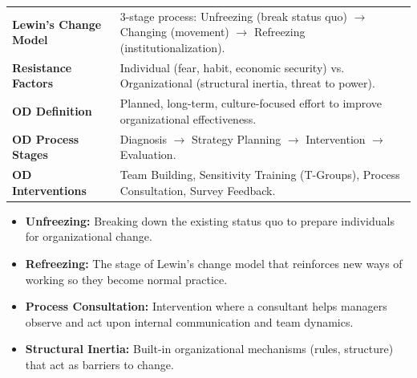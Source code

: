 \documentclass[11pt,a4paper]{article}
\begin{document}
\begin{tcolorbox}[formulabox, title={\textbf{Key Concepts and Metrics at a Glance}}]
\renewcommand{\arraystretch}{1.35}
\begin{tabularx}{\linewidth}{>{\raggedright\arraybackslash\bfseries}p{4.5cm} X}
Lewin's Change Model & 3-stage process: Unfreezing (break status quo) $\to$ Changing (movement) $\to$ Refreezing (institutionalization). \\[4pt]
Resistance Factors & Individual (fear, habit, economic security) vs. Organizational (structural inertia, threat to power). \\[4pt]
OD Definition & Planned, long-term, culture-focused effort to improve organizational effectiveness. \\[4pt]
OD Process Stages & Diagnosis $\to$ Strategy Planning $\to$ Intervention $\to$ Evaluation. \\[4pt]
OD Interventions & Team Building, Sensitivity Training (T-Groups), Process Consultation, Survey Feedback. \\
\end{tabularx}
\end{tcolorbox}

\begin{tcolorbox}[defbox, title={\textbf{One-Line Definitions for Exam Revision}}]
  \begin{itemize}[leftmargin=*, itemsep=2pt]
    \item \textbf{Unfreezing:} Breaking down the existing status quo to prepare individuals for organizational change.
    \item \textbf{Refreezing:} The stage of Lewin's change model that reinforces new ways of working so they become normal practice.
    \item \textbf{Process Consultation:} Intervention where a consultant helps managers observe and act upon internal communication and team dynamics.
    \item \textbf{Structural Inertia:} Built-in organizational mechanisms (rules, structure) that act as barriers to change.
  \end{itemize}
\end{tcolorbox}
\end{document}
